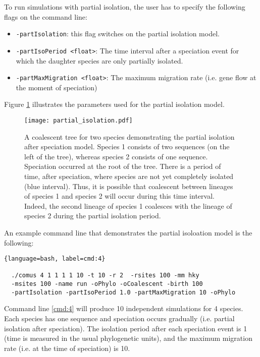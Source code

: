 To run simulations with partial isolation, the user has to specify the following flags on the command line:

\begin{itemize}
\item \verb!-partIsolation!:  this flag switches on the partial isolation model.
\item \verb!-partIsoPeriod <float>!: The time interval after a speciation event for which the daughter species are only partially isolated.
\item \verb!-partMaxMigration <float>!: The maximum migration rate (i.e. gene flow at the moment of speciation)
\end{itemize}

Figure \ref{fig:6} illustrates the parameters used for the partial isolation model.



\begin{figure}[htbp!]
\texttt{[image: partial\_isolation.pdf]}
\caption{A coalescent tree for two species demonstrating the partial isolation after speciation model. Species 1 consists of two sequences (on the left of the tree), whereas species 2 consists of one sequence. Speciation occurred at the root of the tree. There is a period of time, after speciation, where species are not yet completely isolated (blue interval). Thus, it is possible that coalescent between lineages of species 1 and species 2 will occur during this time interval. Indeed, the second lineage of species 1 coalesces with the lineage of species 2 during the partial isolation period. }
\label{fig:6}

\end{figure}

An example command line that demonstrates the partial isoloation model is the following:


\begin{lstlisting}[label=cmd:4, caption={Command line to simulate under the partial isolation model}]{language=bash, label=cmd:4}
  
  ./comus 4 1 1 1 1 10 -t 10 -r 2  -rsites 100 -mm hky 
  -msites 100 -name run -oPhylo -oCoalescent -birth 100  
  -partIsolation -partIsoPeriod 1.0 -partMaxMigration 10 -oPhylo

\end{lstlisting}

Command line \ref{cmd:4} will produce 10 independent simulations for 4 species. Each species has one sequence and speciation occurs gradually (i.e. partial isolation after speciation). The isolation period after each speciation event is 1 (time is measured in the usual phylogenetic units), and the maximum migration rate (i.e. at the time of speciation) is 10. 


